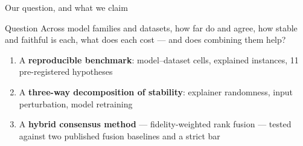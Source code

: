 \begin{frame}{Our question, and what we claim}
\begin{block}{Question}
Across model families and datasets, how far do \shap{} and \lime{} agree, how stable and
faithful is each, what does each cost --- and does combining them help?
\end{block}
\medskip
\begin{enumerate}\setlength\itemsep{0.5em}
  \item A \textbf{reproducible benchmark}: \NumCells{} model--dataset cells,
    \NumExplained{} explained instances, 11 pre-registered hypotheses
  \item A \textbf{three-way decomposition of stability}: explainer randomness,
    input perturbation, model retraining
  \item A \textbf{hybrid consensus method} --- fidelity-weighted rank fusion --- tested
    against two published fusion baselines and a strict bar
\end{enumerate}
\end{frame}

